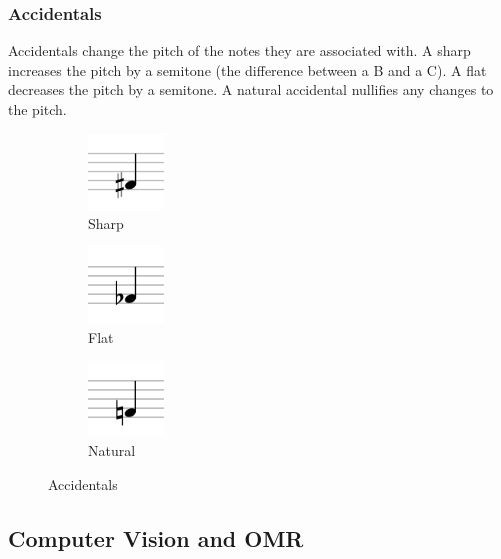        \subsubsection{Accidentals}
            Accidentals change the pitch of the notes they are associated with. A sharp increases the pitch by a semitone (the difference between a B and a C). A flat decreases the pitch by a semitone. A natural accidental nullifies any changes to the pitch.
            \begin{figure}[h!]
                \centering
                \begin{subfigure}{0.3\textwidth}
                    \centering
                    \includegraphics[width=20mm]{./assets/sharp.png}
                    \caption{Sharp}
                    \label{image:sharp}
                \end{subfigure}
                \begin{subfigure}{0.3\textwidth}
                    \centering
                    \includegraphics[width=20mm]{./assets/flat.png}
                    \caption{Flat}
                    \label{image:flat}
                \end{subfigure}
                \begin{subfigure}{0.3\textwidth}
                    \centering
                    \includegraphics[width=20mm]{./assets/natural.png}
                    \caption{Natural}
                    \label{image:natural}
                \end{subfigure}
                \caption{Accidentals}
                \label{image:accidentals}
            \end{figure}

    \subsection{Computer Vision and OMR}
